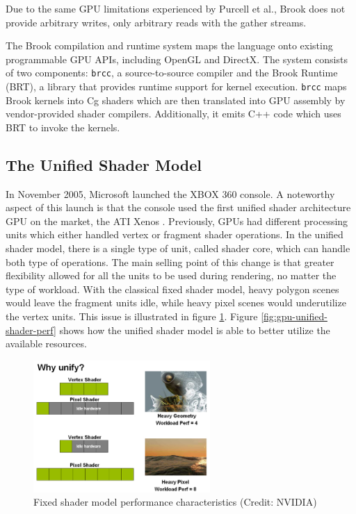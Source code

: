 Due to the same GPU limitations experienced by Purcell et al., Brook does not provide arbitrary writes, only arbitrary reads with the gather streams.

The Brook compilation and runtime system maps the language onto existing programmable GPU APIs, including OpenGL and DirectX. The system consists of two components: \texttt{brcc}, a source-to-source compiler and the Brook Runtime (BRT), a library that provides runtime support for kernel execution. \texttt{brcc} maps Brook kernels into Cg shaders which are then translated into GPU assembly by vendor-provided shader compilers. Additionally, it emits C++ code which uses BRT to invoke the kernels. 

\subsection{The Unified Shader Model}

In November 2005, Microsoft launched the XBOX 360 console. A noteworthy aspect of this launch is that the console used the first unified shader architecture GPU on the market, the ATI Xenos \cite{xbox_360_specs}. Previously, GPUs had different processing units which either handled vertex or fragment shader operations. In the unified shader model, there is a single type of unit, called shader core, which can handle both type of operations. The main selling point of this change is that greater flexibility allowed for all the units to be used during rendering, no matter the type of workload. With the classical fixed shader model, heavy polygon scenes would leave the fragment units idle, while heavy pixel scenes would underutilize the vertex units. This issue is illustrated in figure \ref{fig:gpu-fixed-shader-perf}. Figure \ref{fig:gpu-unified-shader-perf} shows how the unified shader model is able to better utilize the available resources.

\begin{figure}[ht]
    \centering
    \includegraphics[width=0.6\textwidth]{img/classic-model-gpu-idle-units.png}
    \captionsetup{justification=centering}
    \caption{Fixed shader model performance characteristics (Credit: NVIDIA)}
    \label{fig:gpu-fixed-shader-perf}
\end{figure}

